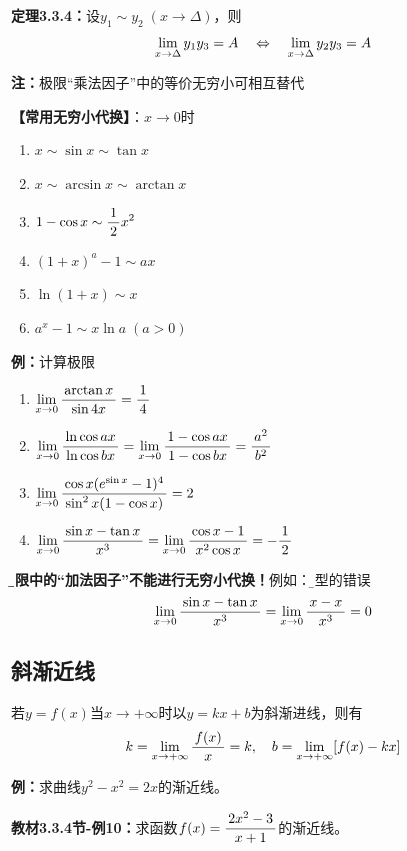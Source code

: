 {\bf 定理3.3.4：}设$y_1\sim y_2\;(x\to\Delta)$，则
$$\lim\limits_{x\to{\Delta}}y_1y_3=A\quad\Leftrightarrow\quad\lim\limits_{x\to{\Delta}}y_2y_3=A$$

{\bf 注：}极限“乘法因子”中的等价无穷小可相互替代

{\b{\bf 【常用无穷小代换】}：$x\to 0$时
\begin{enumerate}[(1)]
  \setlength{\itemindent}{1cm}
  \item $x\sim \sin x\sim \tan x$ 
  \item $x \sim\arcsin x\sim\arctan x$ 
  \item $1-\cos x\sim \displaystyle\frac{\,{1}\,}{\,{2}\,} x^2$ 
  \item $(1+x)^a-1\sim ax$ 
  \item $\ln(1+x)\sim x$ 
  \item $a^x-1\sim x\ln a\;(a>0)$
\end{enumerate}}

{\bf 例：}计算极限
\begin{enumerate}[(1)]
  \setlength{\itemindent}{1cm}
  \item $\lim\limits_{x\to{0}}\displaystyle\frac{\,{\arctan x}\,}{\,{\sin 4x}\,}=\displaystyle\frac{\,{1}\,}{\,{4}\,}$ 
  \item $\lim\limits_{x\to{0}}\displaystyle\frac{\,{\ln\cos ax}\,}{\,{\ln\cos bx}\,}=\lim\limits_{x\to{0}}\displaystyle\frac{\,{1-\cos ax}\,}{\,{1-\cos
  bx}\,}=\displaystyle\frac{\,{a^2}\,}{\,{b^2}\,}$
  \item $\lim\limits_{x\to{0}}\displaystyle\frac{\,{\cos x(e^{\sin x}-1)^4}\,}{\,{\sin^2 x(1-\cos x)}\,}=2$ 
  \item $\lim\limits_{x\to{0}}\displaystyle\frac{\,{\sin x-\tan x}\,}{\,{x^3}\,}=\lim\limits_{x\to{0}}\displaystyle\frac{\,{\cos x-1}\,}{\,{x^2\cos
  x}\,}=-\displaystyle\frac{\,{1}\,}{\,{2}\,}$
\end{enumerate}

{\bf\b 极限中的“加法因子”不能进行无穷小代换！}例如：{\b 典型的错误
$$\lim\limits_{x\to{0}}\displaystyle\frac{\,{\sin x-\tan x}\,}{\,{x^3}\,}=\lim\limits_{x\to{0}}\displaystyle\frac{\,{x-x}\,}{\,{x^3}\,}=0$$
}

\subsection{斜渐近线}

若$y=f(x)$当$x\to+\infty$时以$y=kx+b$为斜渐进线，则有
$$k=\lim\limits_{x\to{+\infty}}\displaystyle\frac{\,{f(x)}\,}{\,{x}\,}=k,\quad b=\lim\limits_{x\to{+\infty}}[f(x)-kx]$$

{\bf 例：}求曲线$y^2-x^2=2x$的渐近线。

{\bf 教材3.3.4节-例10：}求函数$f(x)=\displaystyle\frac{\,{2x^2-3}\,}{\,{x+1}\,}$的渐近线。

\begin{center}
\end{center}

